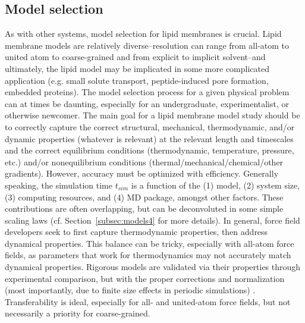 \documentclass[9pt,bestpractices]{livecoms}
\begin{document}
\subsection{Model selection}
\label{subsec:models3}
As with other systems, model selection for lipid membranes is crucial.
Lipid membrane models are relatively diverse--resolution can range from all-atom to united atom to coarse-grained and from explicit to implicit solvent--and ultimately, the lipid model may be implicated in some more complicated application (e.g. small solute transport, peptide-induced pore formation, embedded proteins).
The model selection process for a given physical problem can at times be daunting, especially for an undergraduate, experimentalist, or otherwise newcomer.
The main goal for a lipid membrane model study should be to correctly capture the correct structural, mechanical, thermodynamic, and/or dynamic properties (whatever is relevant) at the relevant length and timescales and the correct equilibrium conditions (thermodynamic, temperature, pressure, etc.) and/or nonequilibrium conditions (thermal/mechanical/chemical/other gradients).
However, accuracy must be optimized with efficiency.
Generally speaking, the simulation time $t_{sim}$ is a function of the (1) model, (2) system size, (3) computing resources, and (4) MD package, amongst other factors.
These contributions are often overlapping, but can be deconvoluted in some simple scaling laws (cf. Section~\ref{subsec:models4} for more details).
In general, force field developers seek to first capture thermodynamic properties, then address dynamical properties.
This balance can be tricky, especially with all-atom force fields, as parameters that work for thermodynamics may not accurately match dynamical properties.
Rigorous models are validated via their properties through experimental comparison, but with the proper corrections and normalization (most importantly, due to finite size effects in periodic simulations) \cite{Venable2017,Klauda2006b}.
Transferability is ideal, especially for all- and united-atom force fields, but not necessarily a priority for coarse-grained.
\end{document}
